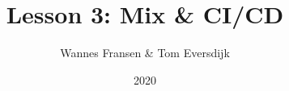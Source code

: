 \documentclass{beamer}
\title{Lesson 3: Mix \& CI/CD}
\author{Wannes Fransen \& Tom Eversdijk}
\institute{UC Leuven}
\date{2020}
\begin{document}
\frame{\titlepage}





\end{document}
